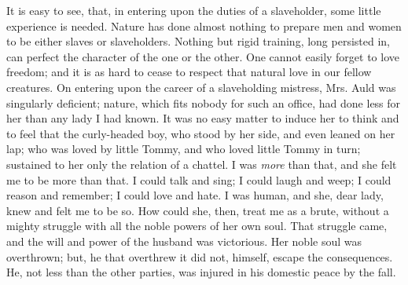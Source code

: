 It is easy to see, that, in entering upon the duties of a slaveholder,
some little experience is needed. Nature has done almost nothing to
prepare men and women to be either slaves or slaveholders. Nothing but
rigid training, long persisted in, can perfect the character of the one
or the other. One cannot easily forget to love freedom; and it is as
hard to cease to respect that natural love in our fellow creatures. On
entering upon the career of a slaveholding mistress, Mrs. Auld was
singularly deficient; nature, which fits nobody for such an office, had
done less for her than any lady I had known. It was no easy matter to
induce her to think and to feel that the curly-headed boy, who stood by
her side, and even leaned on her lap; who was loved by little Tommy, and
who loved little Tommy in turn; sustained to her only the relation of a
chattel. I was \emph{more} than that, and she felt
{\protect\hypertarget{153}{}{}}me to be more than that. I could talk and
sing; I could laugh and weep; I could reason and remember; I could love
and hate. I was human, and she, dear lady, knew and felt me to be so.
How could she, then, treat me as a brute, without a mighty struggle with
all the noble powers of her own soul. That struggle came, and the will
and power of the husband was victorious. Her noble soul was overthrown;
but, he that overthrew it did not, himself, escape the consequences. He,
not less than the other parties, was injured in his domestic peace by
the fall.

